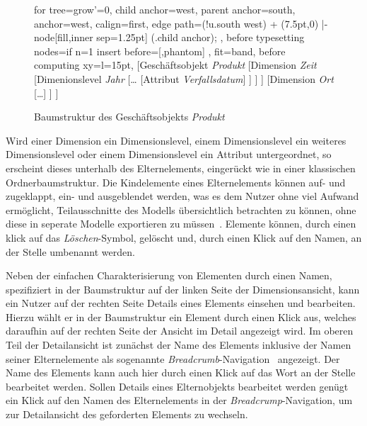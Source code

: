 \documentclass[
  language=german, %
  type=bachelor,%
  ngerman
]{isthesis}
\begin{document}
\begin{content}
\begin{figure}
		\begin{forest}
			for tree={grow'=0,
				child anchor=west,
				parent anchor=south,
				anchor=west,
				calign=first,
				edge path={\noexpand{}
					(!u.south west) + (7.5pt,0) |- node[fill,inner sep=1.25pt] {} (.child anchor);
				},
				before typesetting nodes={if n=1
						{insert before={[,phantom]}}
						{}
				},
				fit=band,
				before computing xy={l=15pt},
			}
		[Geschäftsobjekt \textit{Produkt}
			[Dimension \textit{Zeit}
				[Dimenionslevel \textit{Jahr}
					[\ldots{}
						[Attribut \textit{Verfallsdatum}]
					]
				]
			]
			[Dimension \textit{Ort}
				[\ldots{}]
			]
		]
		\end{forest}
    \caption{Baumstruktur des Geschäftsobjekts \textit{Produkt}}\label{fig:baumstruktur-produkt}
	\end{figure}

  Wird einer Dimension ein Dimensionslevel, einem Dimensionslevel ein weiteres
  Dimensionslevel oder einem Dimensionslevel ein Attribut untergeordnet, so
  erscheint dieses unterhalb des Elternelements, eingerückt wie in einer
  klassischen Ordnerbaumstruktur. Die Kindelemente eines Elternelements können
  auf- und zugeklappt, \bzw{} ein- und ausgeblendet werden, was es dem Nutzer
  ohne viel Aufwand ermöglicht, Teilausschnitte des Modells übersichtlich
  betrachten zu können, ohne diese in seperate Modelle exportieren zu
  müssen~\cite[][S. 6 f.]{fleischer2013konstruktion}.  Elemente können, durch einen klick auf
  das \textit{Löschen}-Symbol, gelöscht und, durch einen Klick auf den Namen, an
  der Stelle umbenannt werden.

  Neben der einfachen Charakterisierung von Elementen durch einen Namen,
  spezifiziert in der Baumstruktur auf der linken Seite der Dimensionsansicht,
  kann ein Nutzer auf der rechten Seite Details eines Elements einsehen und
  bearbeiten.  Hierzu wählt er in der Baumstruktur ein Element durch einen
  Klick aus, welches daraufhin auf der rechten Seite der Ansicht im Detail
  angezeigt wird. Im oberen Teil der Detailansicht ist zunächst der Name des
  Elements inklusive der Namen seiner Elternelemente als sogenannte
  \textit{Breadcrumb}-Navigation~\cite[][S. 1316]{maldonado2002common}
  angezeigt.  Der Name des Elements kann auch hier durch einen Klick auf das
  Wort an der Stelle bearbeitet werden. Sollen Details eines Elternobjekts
  bearbeitet werden genügt ein Klick auf den Namen des Elternelements in der
  \textit{Breadcrump}-Navigation, um zur Detailansicht des geforderten Elements
  zu wechseln. 


\end{content}
\end{document}
